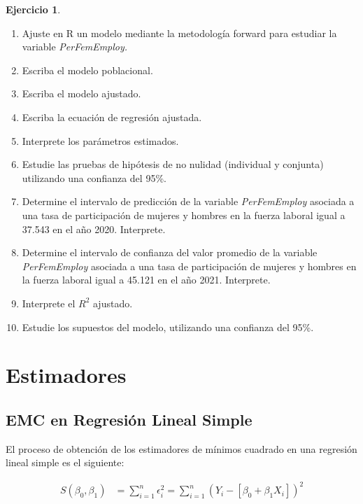 \documentclass[
  11pt,
]{book}
\providecommand{\tightlist}{%
  \setlength{\itemsep}{0pt}\setlength{\parskip}{0pt}}
\theoremstyle{definition}
\theoremstyle{definition}
\theoremstyle{definition}
\newtheorem{exercise}{Ejercicio}[chapter]
\theoremstyle{definition}
\theoremstyle{remark}
\begin{document}
\begin{exercise}
\begin{enumerate}
\def\labelenumi{\arabic{enumi}.}
\tightlist
\item
  Ajuste en R un modelo mediante la metodología forward para estudiar la variable \emph{PerFemEmploy.}
\item
  Escriba el modelo poblacional.
\item
  Escriba el modelo ajustado.
\item
  Escriba la ecuación de regresión ajustada.
\item
  Interprete los parámetros estimados.
\item
  Estudie las pruebas de hipótesis de no nulidad (individual y conjunta) utilizando una confianza del 95\%.
\item
  Determine el intervalo de predicción de la variable \emph{PerFemEmploy} asociada a una tasa de participación de mujeres y hombres en la fuerza laboral igual a 37.543 en el año 2020. Interprete.
\item
  Determine el intervalo de confianza del valor promedio de la variable \emph{PerFemEmploy} asociada a una tasa de participación de mujeres y hombres en la fuerza laboral igual a 45.121 en el año 2021. Interprete.
\item
  Interprete el \(R^2\) ajustado.
\item
  Estudie los supuestos del modelo, utilizando una confianza del 95\%.
\end{enumerate}

\end{exercise}

\appendix {}


\chapter{Estimadores}\label{estimadores}

\section{EMC en Regresión Lineal Simple}\label{RLS-EMC}

El proceso de obtención de los estimadores de mínimos cuadrado en una regresión lineal simple es el siguiente:

\begin{equation}
\begin{split}
S(\beta_0,\beta_1) &= \sum_{i=1}^n\epsilon_i^2 = \sum_{i=1}^n (Y_i - [\beta_0 + \beta_1X_i])^2
\end{split}
\label{eq:betasestimador-demostracion}
\end{equation}
\end{document}
